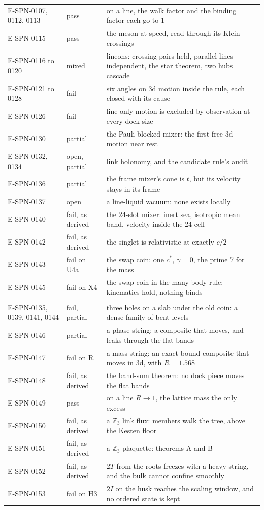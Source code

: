 \begin{small}
\begin{longtable}{@{}>{\raggedright\arraybackslash}p{3.4cm}>{\raggedright\arraybackslash}p{2.2cm}p{9.3cm}@{}}
E-SPN-0107, 0112, 0113 & pass & on a line, the walk factor and the binding factor each go to 1 \\
E-SPN-0115 & pass & the meson at speed, read through its Klein crossings \\
E-SPN-0116 to 0120 & mixed & lineons: crossing pairs held, parallel lines independent, the star theorem, two hubs cascade \\
E-SPN-0121 to 0128 & fail & six angles on 3d motion inside the rule, each closed with its cause \\
E-SPN-0126 & fail & line-only motion is excluded by observation at every dock size \\
E-SPN-0130 & partial & the Pauli-blocked mixer: the first free 3d motion near rest \\
E-SPN-0132, 0134 & open, partial & link holonomy, and the candidate rule's audit \\
E-SPN-0136 & partial & the frame mixer's cone is $t$, but its velocity stays in its frame \\
E-SPN-0137 & open & a line-liquid vacuum: none exists locally \\
E-SPN-0140 & fail, as derived & the 24-slot mixer: inert sea, isotropic mean band, velocity inside the 24-cell \\
E-SPN-0142 & fail, as derived & the singlet is relativistic at exactly $c/2$ \\
E-SPN-0143 & fail on U4a & the swap coin: one $c^*$, $\gamma = 0$, the prime 7 for the mass \\
E-SPN-0145 & fail on X4 & the swap coin in the many-body rule: kinematics hold, nothing binds \\
\multicolumn{3}{@{}l}{\emph{Binding}} \\
E-SPN-0135, 0139, 0141, 0144 & fail, partial & three holes on a slab under the old coin: a dense family of bent levels \\
E-SPN-0146 & partial & a phase string: a composite that moves, and leaks through the flat bands \\
E-SPN-0147 & fail on R & a mass string: an exact bound composite that moves in 3d, with $R = 1.568$ \\
E-SPN-0148 & fail, as derived & the band-sum theorem: no dock piece moves the flat bands \\
E-SPN-0149 & pass & on a line $R \to 1$, the lattice mass the only excess \\
E-SPN-0150 & fail, as derived & a $\mathbb{Z}_3$ link flux: members walk the tree, above the Kesten floor \\
E-SPN-0151 & fail, as derived & a $\mathbb{Z}_3$ plaquette: theorems A and B \\
E-SPN-0152 & fail, as derived & $2T$ from the roots freezes with a heavy string, and the bulk cannot confine smoothly \\
E-SPN-0153 & fail on H3 & $2I$ on the husk reaches the scaling window, and no ordered state is kept \\
\bottomrule
\end{longtable}
\end{small}
